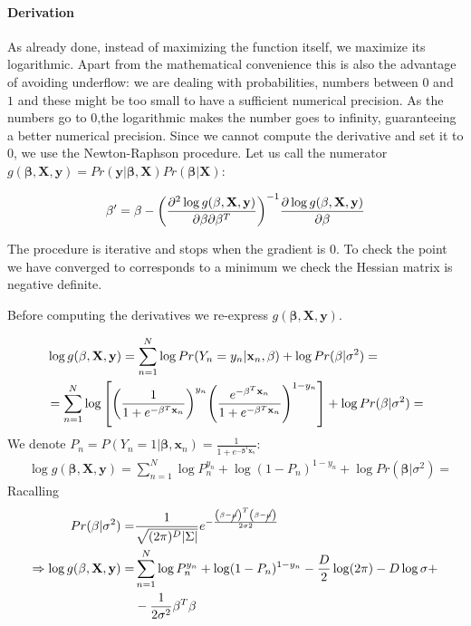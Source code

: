 \documentclass[12pt, letterpaper]{article}
\theoremstyle{definition}
\newcommand{\X}{\mathrm{\mathbf{X}}}
\newcommand{\y}{\mathbf{y}}
\newcommand{\be}{\mathbf{\beta}}
\newcommand{\x}{\mathbf{x}}
\DeclarePairedDelimiter\autobracket{(}{)}
\newcommand{\br}[1]{\autobracket*{#1}}
\begin{document}
\paragraph{Derivation}
As already done, instead of maximizing the function itself, we maximize its logarithmic. Apart from the mathematical convenience this is also the advantage of avoiding underflow: we are dealing with probabilities, numbers between $0$ and $1$ and these might be too small to have a sufficient numerical precision. As the numbers go to $0$,the logarithmic makes the number goes to infinity, guaranteeing a better numerical precision.
 Since we cannot compute the derivative and set it to $0$, we use the Newton-Raphson procedure. Let us call the numerator $g(\be,\X,\y) = Pr(\y|\be,\X)Pr(\be|\X)$:

\begin{equation}
\be' = \be - \br{\frac{\partial^2\log g(\be,\X,\y)}{\partial \be \partial \be^T}}^{-1} \frac{\partial \log g(\be,\X,\y)}{\partial \be}
\end{equation}

The procedure is iterative and stops when the gradient is $0$. To check the point we have converged to corresponds to a minimum we check the Hessian matrix is negative definite.

Before computing the derivatives we re-express $g(\be,\X,\y)$.

\begin{equation}
\begin{aligned}
&\log g(\be,\X,\y) = \sum_{n=1}^N \log Pr(Y_n=y_n|\x_n, \be) + \log Pr(\be|\sigma^2) = \\
&=  \sum_{n=1}^N \log \left[\br{\frac{1}{1+e^{-\be^T\x_n}}}^{y_n} \br{\frac{e^{-\be^T\x_n}}{1+e^{-\be^T\x_n}}}^{1-y_n}\right] + \log Pr(\be|\sigma^2) =
\end{aligned}
\end{equation}
We denote $P_n=P(Y_n=1|\be, \x_n) = \frac{1}{1+e^{-\be^T\x_n}}$:
\begin{equation}
\begin{aligned}
&\log g(\be,\X,\y) =  \sum_{n=1}^N \log P_n^{y_n} +\log(1-P_n)^{1-y_n}+ \log Pr(\be|\sigma^2) =
\end{aligned}
\end{equation}
Racalling
\begin{equation}
\begin{aligned}
Pr(\be|\sigma^2)  =& \frac{1}{\sqrt{(2\pi)^D|\Sigma|}} e^{-\frac{\br{\be-\cancel{\mu}}^T\br{\be-\cancel{\mu}}}{2\sigma2}}\\
\Rightarrow\log g(\be,\X,\y) =&  \sum_{n=1}^N \log P_n^{y_n} +\log(1-P_n)^{1-y_n} -\frac{D}{2}\log(2\pi) - D\log\sigma +\\
&- \frac{1}{2\sigma^2} \be^T\be
\end{aligned}
\end{equation}
\end{document}
